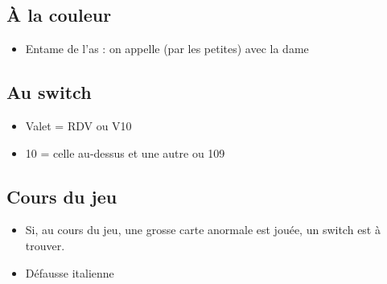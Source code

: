 \documentclass[a4paper]{article}
\begin{document}
\subsection{À la couleur}

\begin{itemize}
\item Entame de l'as : on appelle (par les petites) avec la dame

\end{itemize}

\subsection{Au switch}

\begin{itemize}
\item Valet = RDV ou V10

\end{itemize}

\begin{itemize}
\item 10 = celle au-dessus et une autre ou 109

\end{itemize}

\subsection{Cours du jeu}

\begin{itemize}
\item Si, au cours du jeu, une grosse carte anormale est jouée, un switch est à trouver.

\end{itemize}

\begin{itemize}
\item Défausse italienne

\end{itemize}
\end{document}
